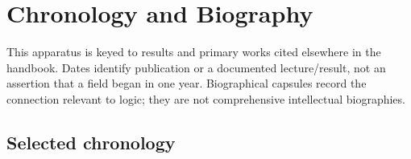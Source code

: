 \chapter{Chronology and Biography}\label{sec:p13-chronology-and-biography}

This apparatus is keyed to results and primary works cited elsewhere in the
handbook. Dates identify publication or a documented lecture/result, not an
assertion that a field began in one year. Biographical capsules record the
connection relevant to logic; they are not comprehensive intellectual
biographies.

\section{Selected chronology}
\label{sec:p13-chronology}

